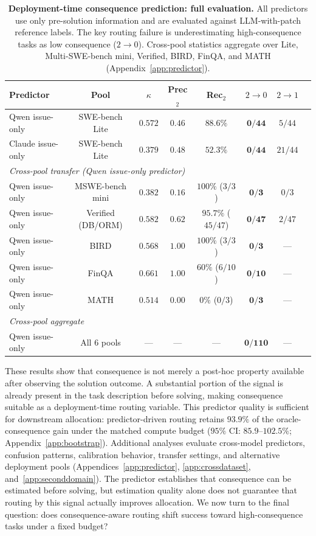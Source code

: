 \documentclass{article}
\begin{document}
\begin{table}[t]
\centering
\caption{\textbf{Deployment-time consequence prediction: full evaluation.} All predictors use only pre-solution information and are evaluated against LLM-with-patch reference labels. The key routing failure is underestimating high-consequence tasks as low consequence ($2\rightarrow0$). Cross-pool statistics aggregate over Lite, Multi-SWE-bench mini, Verified, BIRD, FinQA, and MATH (Appendix~\ref{app:predictor}).}
\label{tab:predictor}
\small
\setlength{\tabcolsep}{4pt}
\begin{tabular}{lccccccc}
\toprule
Predictor & Pool & $\kappa$ & Prec$_2$ & Rec$_2$ & $2\rightarrow0$ & $2\rightarrow1$ \\
\midrule
Qwen issue-only & SWE-bench Lite & $\mathbf{0.572}$ & $0.46$ & $\mathbf{88.6\%}$ & $\mathbf{0/44}$ & $5/44$ \\
Claude issue-only & SWE-bench Lite & $0.379$ & $0.48$ & $52.3\%$ & $\mathbf{0/44}$ & $21/44$ \\
\midrule
\multicolumn{7}{l}{\textit{Cross-pool transfer (Qwen issue-only predictor)}} \\
Qwen issue-only & MSWE-bench mini & $0.382$ & $0.16$ & $100\%$ ($3/3$) & $\mathbf{0/3}$ & $0/3$ \\
Qwen issue-only & Verified (DB/ORM) & $0.582$ & $0.62$ & $95.7\%$ ($45/47$) & $\mathbf{0/47}$ & $2/47$ \\
Qwen issue-only & BIRD & $0.568$ & $1.00$ & $100\%$ ($3/3$) & $\mathbf{0/3}$ & --- \\
Qwen issue-only & FinQA & $0.661$ & $1.00$ & $60\%$ ($6/10$) & $\mathbf{0/10}$ & --- \\
Qwen issue-only & MATH & $0.514$ & $0.00$ & $0\%$ ($0/3$) & $\mathbf{0/3}$ & --- \\
\midrule
\multicolumn{7}{l}{\textit{Cross-pool aggregate}} \\
Qwen issue-only & All 6 pools & --- & --- & --- & $\mathbf{0/110}$ & --- \\
\bottomrule
\end{tabular}
\end{table}

These results show that consequence is not merely a post-hoc property available after observing the solution outcome. A substantial portion of the signal is already present in the task description before solving, making consequence suitable as a deployment-time routing variable. This predictor quality is sufficient for downstream allocation: predictor-driven routing retains $93.9\%$ of the oracle-consequence gain under the matched compute budget ($95\%$ CI: $85.9$--$102.5\%$; Appendix~\ref{app:bootstrap}).
Additional analyses evaluate cross-model predictors, confusion patterns, calibration behavior, transfer settings, and alternative deployment pools (Appendices~\ref{app:predictor}, \ref{app:crossdataset}, and~\ref{app:seconddomain}).
The predictor establishes that consequence can be estimated before solving, but estimation quality alone does not guarantee that routing by this signal actually improves allocation. We now turn to the final question: does consequence-aware routing shift success toward high-consequence tasks under a fixed budget?
\end{document}
